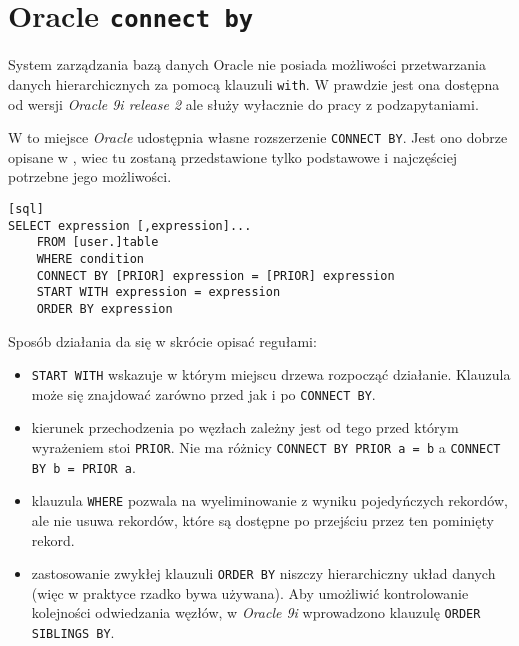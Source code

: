 \section{Oracle \texttt{connect by}}






System zarządzania bazą danych Oracle nie posiada możliwości przetwarzania danych hierarchicznych za pomocą klauzuli \texttt{with}.
W prawdzie jest ona dostępna od wersji \emph{Oracle 9i release 2} ale służy wyłacznie do pracy z podzapytaniami.

W to miejsce \emph{Oracle} udostępnia własne rozszerzenie \texttt{CONNECT BY}. 
Jest ono dobrze opisane w \cite{oracle-ref11}, wiec tu zostaną przedstawione tylko podstawowe i najczęściej potrzebne jego możliwości.


\begin{verbatim}[sql]
SELECT expression [,expression]...
    FROM [user.]table
    WHERE condition
    CONNECT BY [PRIOR] expression = [PRIOR] expression
    START WITH expression = expression
    ORDER BY expression
\end{verbatim}


Sposób działania da się w skrócie opisać regułami:
\begin{itemize}
    \item \texttt{START WITH} wskazuje w którym miejscu drzewa rozpocząć działanie. 
        Klauzula może się znajdować zarówno przed jak i po \texttt{CONNECT BY}.
    \item kierunek przechodzenia po węzłach zależny jest od tego przed którym wyrażeniem stoi \texttt{PRIOR}.
         Nie ma różnicy \verb|CONNECT BY PRIOR a = b| a \verb|CONNECT BY b = PRIOR a|.
    \item klauzula \texttt{WHERE} pozwala na wyeliminowanie z wyniku pojedyńczych rekordów, 
        ale nie usuwa rekordów, które są dostępne po przejściu przez ten pominięty rekord.
    \item zastosowanie zwykłej klauzuli \texttt{ORDER BY} niszczy hierarchiczny układ danych 
        (więc w praktyce rzadko bywa używana).
        Aby umożliwić kontrolowanie kolejności odwiedzania węzłów, 
        w \emph{Oracle 9i} wprowadzono klauzulę \texttt{ORDER SIBLINGS BY}.
\end{itemize}


